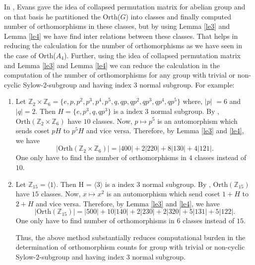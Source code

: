 \documentclass[11pt,a4paper]{article}
\theoremstyle{definition}
\theoremstyle{remark}
\begin{document}
	In \cite{evans2}, Evans gave the idea of collapsed permutation matrix for abelian group and on that basis he partitioned the Orth($G$) into classes and finally computed number of orthomorphisms in these classes, but by using Lemma \ref{le3} and Lemma \ref{le4} we have find inter relations between these classes. That helps in reducing the calculation for the  number of orthomorphisms as we have seen in the case of Orth($A_4$). Further, using the idea of collapsed permutation matrix and Lemma \ref{le3} and Lemma \ref{le4} we can reduce the calculation in the computation of the number of orthomorphisms for any group with trivial or non-cyclic Sylow-$2$-subgroup and having index $3$ normal subgroup. For example:
	
	 \begin{enumerate}
				\item Let $\mathbb{Z}_{2} \times \mathbb{Z}_{6} = \{e,p,p^2,p^3,p^4,p^5,q,qp,qp^2,qp^3,qp^4,qp^5\}$ where, $|p|$ $ = 6$ and $|q|= 2$. Then $H =\{e, p^{3},q,qp^{3}\}$ is a index $3$ normal subgroup. By \cite{evans2}, $\text{Orth}(\mathbb{Z}_{2} \times \mathbb{Z}_{6})$ have $10$ classes. Now, $p \mapsto p^{5}$ is an automorphism which sends coset $pH$ to $p^{5}H$ and vice versa. Therefore, by Lemma \ref{le3} and \ref{le4}, we have $$|\text{Orth}(\mathbb{Z}_{2} \times \mathbb{Z}_{6})| = |400| + 2|220| + 8|130| + 4|121|.$$ One only have to find the number of orthomorphisms in $4$ classes instead of $10$.
				\item  Let $\mathbb{Z}_{15} = \langle 1 \rangle$. Then H = $\langle 3 \rangle$ is a index $3$ normal subgroup.  By \cite{evans2}, $\text{Orth}(\mathbb{Z}_{15})$ have $15$ classes. Now, $x \mapsto x^{2}$ is an automorphism which send coset $1 + H$ to $2+H$ and vice versa. Therefore, by  Lemma \ref{le3} and \ref{le4}, we have $$|\text{Orth}(\mathbb{Z}_{15})| = |500| + 10|140| + 2|230| + 2 |320| + 5|131| +  5|122|.$$ One only have to  find number of orthomorphisms in $6$ classes instead of $15.$
				
				Thus, the above method substantially reduces computational burden in the determination of orthomorphism counts for group with trivial or non-cyclic Sylow-$2$-subgroup and having index $3$ normal subgroup.
	\end{enumerate}
%	
\end{document}

